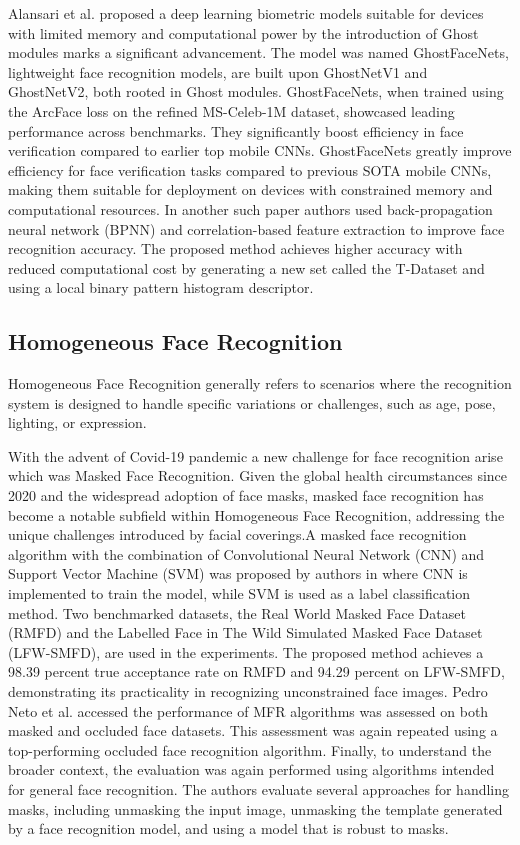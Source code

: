 Alansari et al. \cite{alansari_ghostfacenets_2023} proposed a deep learning biometric models suitable for devices with limited memory and computational power by the introduction of Ghost modules marks a significant advancement. The model was named GhostFaceNets, lightweight face recognition models, are built upon GhostNetV1 and GhostNetV2, both rooted in Ghost modules. GhostFaceNets, when trained using the ArcFace loss on the refined MS-Celeb-1M dataset, showcased leading performance across benchmarks. They significantly boost efficiency in face verification compared to earlier top mobile CNNs. GhostFaceNets greatly improve efficiency for face verification tasks compared to previous SOTA mobile CNNs, making them suitable for deployment on devices with constrained memory and computational resources. In another such paper \cite{abuzneid_enhanced_2018} authors used back-propagation neural network (BPNN) and correlation-based feature extraction to improve face recognition accuracy. The proposed method achieves higher accuracy with reduced computational cost by generating a new set called the T-Dataset and using a local binary pattern histogram descriptor.

\subsection{Homogeneous Face Recognition}

Homogeneous Face Recognition generally refers to scenarios where the recognition system is designed to handle specific variations or challenges, such as age, pose, lighting, or expression.

With the advent of Covid-19 pandemic a new challenge for face recognition arise which was Masked Face Recognition. Given the global health circumstances since 2020 and the widespread adoption of face masks, masked face recognition has become a notable subfield within Homogeneous Face Recognition, addressing the unique challenges introduced by facial coverings.A masked face recognition algorithm with the combination of Convolutional Neural Network (CNN) and Support Vector Machine (SVM) was proposed by authors in \cite{9914874} where CNN is implemented to train the model, while SVM is used as a label classification method. Two benchmarked datasets, the Real World Masked Face Dataset (RMFD) and the Labelled Face in The Wild Simulated Masked Face Dataset (LFW-SMFD), are used in the experiments. The proposed method achieves a 98.39 percent true acceptance rate on RMFD and 94.29 percent on LFW-SMFD, demonstrating its practicality in recognizing unconstrained face images. Pedro Neto et al. \cite{pedro_neto_beyond_2022} accessed the performance of MFR algorithms was assessed on both masked and occluded face datasets. This assessment was again repeated using a top-performing occluded face recognition algorithm. Finally, to understand the broader context, the evaluation was again performed using algorithms intended for general face recognition. The authors evaluate several approaches for handling masks, including unmasking the input image, unmasking the template generated by a face recognition model, and using a model that is robust to masks.

